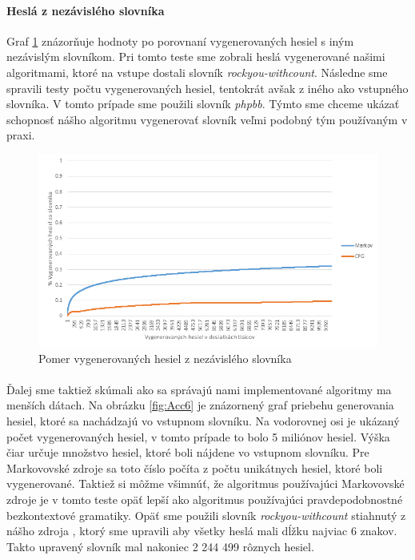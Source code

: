 \paragraph{Heslá z nezávislého slovníka}
Graf \ref{fig:otherDictAcc} znázorňuje hodnoty po porovnaní vygenerovaných hesiel s iným nezávislým slovníkom. Pri tomto teste sme zobrali heslá vygenerované našimi algoritmami, ktoré na vstupe dostali slovník \emph{rockyou-withcount}. Následne sme spravili testy počtu vygenerovaných hesiel, tentokrát avšak z iného ako vstupného slovníka. V tomto prípade sme použili slovník \emph{phpbb}. Týmto sme chceme ukázať schopnosť nášho algoritmu vygenerovať slovník veľmi podobný tým používaným v praxi.

\begin{figure}[ht]
    \centering
    \includegraphics[width=1\textwidth]{otherDictAcc}
    \caption{Pomer vygenerovaných hesiel z nezávislého slovníka}
    \label{fig:otherDictAcc}
\end{figure}

\paragraph{}
Ďalej sme taktiež skúmali ako sa správajú nami implementované algoritmy ma menších dátach. Na obrázku \ref{fig:Acc6} je znázornený graf priebehu generovania hesiel, ktoré sa nachádzajú vo vstupnom slovníku. Na vodorovnej osi je ukázaný počet vygenerovaných hesiel, v tomto prípade to bolo 5 miliónov hesiel. Výška čiar určuje množstvo hesiel, ktoré boli nájdene vo vstupnom slovníku. Pre Markovovské zdroje sa toto číslo počíta z počtu unikátnych hesiel, ktoré boli vygenerované. Taktiež si môžme všimnúť, že algoritmus používajúci Markovovské zdroje je v tomto teste opäť lepší ako algoritmus používajúci pravdepodobnostné bezkontextové gramatiky. Opäť sme použili slovník \emph{rockyou-withcount} stiahnutý z nášho zdroja \cite{dictionaries}, ktorý sme upravili aby všetky heslá mali dĺžku najviac 6 znakov. Takto upravený slovník mal nakoniec 2 244 499 rôznych hesiel.

